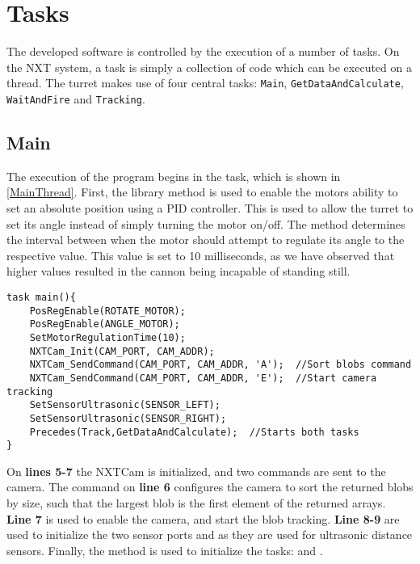 \section{Tasks}
The developed software is controlled by the execution of a number of
tasks. On the NXT system, a task is simply a collection of code which can be
executed on a thread. The turret makes use of four central tasks:
\texttt{Main}, \texttt{GetDataAndCalculate}, \texttt{WaitAndFire} and
\texttt{Tracking}.

\subsection{Main}
The execution of the program begins in the  task, which is shown
in \autoref{MainThread}. First, the library method
 is used to enable the motors ability to set
an absolute position using a PID controller. This is used to allow the turret to
set its angle instead of simply turning the motor on/off.
The  method determines the interval between when
the motor should attempt to regulate its angle to the respective value. This
value is set to 10 milliseconds, as we have observed that higher values resulted
in the cannon being incapable of standing still.\nl

\begin{minipage}[H]{\linewidth}
\begin{lstlisting}[caption = Entry point for the program execution., label = MainThread] 
task main(){
    PosRegEnable(ROTATE_MOTOR);
    PosRegEnable(ANGLE_MOTOR);
    SetMotorRegulationTime(10);
    NXTCam_Init(CAM_PORT, CAM_ADDR);
    NXTCam_SendCommand(CAM_PORT, CAM_ADDR, 'A');  //Sort blobs command
    NXTCam_SendCommand(CAM_PORT, CAM_ADDR, 'E');  //Start camera tracking
    SetSensorUltrasonic(SENSOR_LEFT);
    SetSensorUltrasonic(SENSOR_RIGHT);
    Precedes(Track,GetDataAndCalculate);  //Starts both tasks
}
\end{lstlisting}
\end{minipage}

On \textbf{lines 5-7} the NXTCam is initialized, and two commands are
sent to the camera. The command on \textbf{line 6} configures the camera
to sort the returned blobs by size, such that the largest blob is the first
element of the returned arrays. \textbf{Line 7} is used to enable the camera,
and start the blob tracking. \textbf{Line 8-9} are used to
initialize the two sensor ports  and
 as they are used for ultrasonic distance sensors.
Finally, the  method is used to initialize the
tasks:  and .
